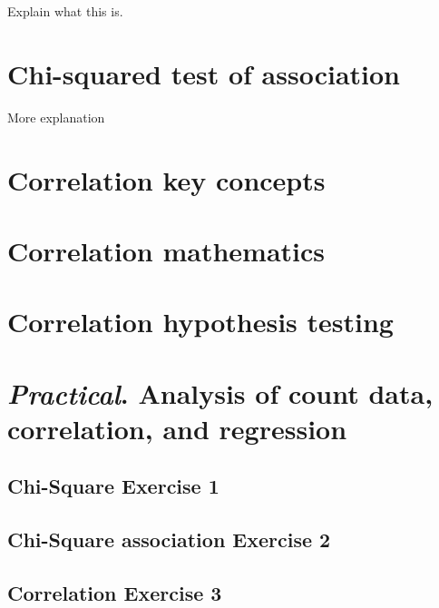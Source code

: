 \documentclass[
]{scrbook}
\begin{document}
Explain what this is.

\hypertarget{chi-squared-test-of-association}{%
\chapter{Chi-squared test of association}\label{chi-squared-test-of-association}}

More explanation

\hypertarget{correlation-key-concepts}{%
\chapter{Correlation key concepts}\label{correlation-key-concepts}}

\hypertarget{correlation-mathematics}{%
\chapter{Correlation mathematics}\label{correlation-mathematics}}

\hypertarget{correlation-hypothesis-testing}{%
\chapter{Correlation hypothesis testing}\label{correlation-hypothesis-testing}}

\hypertarget{practical.-analysis-of-count-data-correlation-and-regression}{%
\chapter{\texorpdfstring{\emph{Practical}. Analysis of count data, correlation, and regression}{Practical. Analysis of count data, correlation, and regression}}\label{practical.-analysis-of-count-data-correlation-and-regression}}

\hypertarget{chi-square-exercise-1}{%
\section{Chi-Square Exercise 1}\label{chi-square-exercise-1}}

\hypertarget{chi-square-association-exercise-2}{%
\section{Chi-Square association Exercise 2}\label{chi-square-association-exercise-2}}

\hypertarget{correlation-exercise-3}{%
\section{Correlation Exercise 3}\label{correlation-exercise-3}}
\end{document}
